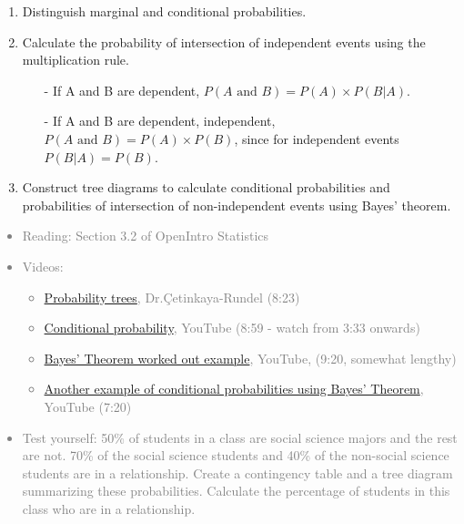 \documentclass[11pt]{article}
\newcommand{\gray}[1]{\textcolor{gray}{#1}}
\begin{document}
%

\begin{enumerate}[resume]
\renewcommand\labelenumi{\textcolor{light}{\textbf{LO \theenumi.}}}

\item Distinguish marginal and conditional probabilities.

\item Calculate the probability of intersection of independent events using the multiplication rule.
\begin{itemize}
\item[-] If A and B are dependent, $P(A \text{ and } B) = P(A) \times P(B | A)$.
\item[-] If A and B are dependent, independent, $P(A \text{ and } B) = P(A) \times P(B)$,  since for independent events $P(B | A) = P(B)$.
\end{itemize}

\item Construct tree diagrams to calculate conditional probabilities and probabilities of intersection of non-independent events using Bayes' theorem.

\end{enumerate}

\gray{
{\it
\vspace{-0.75cm}
\begin{itemize}
\renewcommand{\labelitemi}{{\textcolor{dark}{$\ast$}}}
\item Reading: Section 3.2 of OpenIntro Statistics
\item Videos:
\begin{itemize}
\item \href{http://www.youtube.com/watch?v=HxEz4ZHUY5Y}{Probability trees}, Dr.\c{C}etinkaya-Rundel (8:23)
\item \href{http://www.youtube.com/watch?feature=endscreen&NR=1&v=cwADSMeiIoE}{Conditional probability}, YouTube (8:59 - watch from 3:33 onwards)
\item \href{http://www.youtube.com/watch?v=2Df1sDAyRvQ}{Bayes' Theorem worked out example}, YouTube, (9:20, somewhat lengthy) 
\item \href{http://www.youtube.com/watch?v=E2pOJwSwWDk}{Another example of conditional probabilities using Bayes' Theorem}, YouTube (7:20)
\end{itemize}
\item Test yourself: 50\% of students in a class are social science majors and the rest are not. 70\% of the social science students and 40\% of the non-social science students are in a relationship. Create a contingency table and a tree diagram summarizing these probabilities. Calculate the percentage of students in this class who are in a relationship.
\end{itemize}
}}
\end{document}
